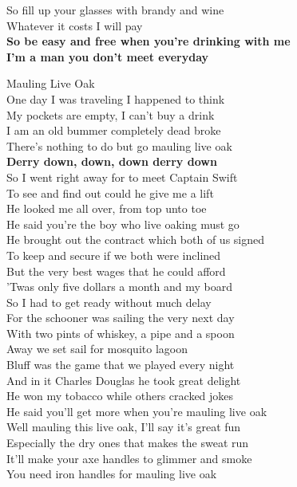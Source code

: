 \documentclass[letterpaper,9pt]{article}
\begin{document}
So fill up your glasses with brandy and wine \\
Whatever it costs I will pay \\
\textbf{So be easy and free when you're drinking with me \\
I'm a man you don't meet everyday} \\

\newpage
{}
\Huge
Mauling Live Oak\\
\Large
One day I was traveling I happened to think \\
My pockets are empty, I can't buy a drink \\
I am an old bummer completely dead broke \\
There's nothing to do but go mauling live oak \\
\textbf{Derry down, down, down derry down} \\

So I went right away for to meet Captain Swift \\
To see and find out could he give me a lift \\
He looked me all over, from top unto toe \\
He said you're the boy who live oaking must go \\

He brought out the contract which both of us signed \\
To keep and secure if we both were inclined \\
But the very best wages that he could afford \\
'Twas only five dollars a month and my board \\

So I had to get ready without much delay \\
For the schooner was sailing the very next day \\
With two pints of whiskey, a pipe and a spoon \\
Away we set sail for mosquito lagoon \\

Bluff was the game that we played every night \\
And in it Charles Douglas he took great delight \\
He won my tobacco while others cracked jokes \\
He said you'll get more when you're mauling live oak \\

Well mauling this live oak, I'll say it's great fun \\
Especially the dry ones that makes the sweat run \\
It'll make your axe handles to glimmer and smoke \\
You need iron handles for mauling live oak \\
\end{document}
